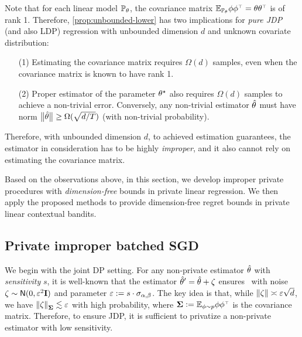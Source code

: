 Note that for each linear model $\mathbb{P}_\theta$, the covariance matrix $\mathbb{E}_{\mathbb{P}_\theta}\phi\phi^{{\scriptscriptstyle\top}}=\theta\theta^{{\scriptscriptstyle\top}}$ is of rank 1. %
Therefore, \cref{prop:unbounded-lower} has two implications for \emph{pure JDP} (and also LDP) regression with unbounded dimension $d$ and unknown covariate distribution:
\begin{itemize}
\item[(1)] Estimating the covariance matrix requires $\Omega(d)$ samples, even when the covariance matrix is known to have rank 1.
\item[(2)] Proper estimator of the parameter $\theta^\star$ also requires $\Omega(d)$ samples to achieve a non-trivial error.
Conversely, any non-trivial estimator $\hat{\theta}$ must have norm $\big\|\hat{\theta}\big\|\geq \Omega(\sqrt{d/T})$ (with non-trivial probability).
\end{itemize}
Therefore, with unbounded dimension $d$, to achieved estimation guarantees, the estimator in consideration has to be highly \emph{improper}, and it also cannot rely on estimating the covariance matrix.


Based on the observations above,
in this section, we develop improper private procedures with \emph{dimension-free} bounds in private linear regression.
We then apply the proposed methods to provide dimension-free regret bounds in private linear contextual bandits.




\subsection{Private improper batched SGD}\label{ssec:l1-dim-free}


We begin with the joint DP setting. For any non-private estimator $\hat{\theta}$ with \emph{sensitivity} $s$, it is well-known that the estimator $\hat{\theta}'=\hat{\theta}+\zeta$ ensures \aJDP~with noise $\zeta\sim \mathsf{N}(0,\varepsilon^2\mathbf{I})$ and parameter $\varepsilon:=s\cdot \sigma_{\alpha,\beta}$. The key idea is that, while $\left\|\zeta\right\|\asymp \varepsilon\sqrt{d}$, we have $\left\|\zeta\right\|_{\boldsymbol{\Sigma}}\lesssim \varepsilon$ with high probability, where $\boldsymbol{\Sigma}\mathrel{\mathop:}= \mathbb{E}_{\phi\sim p}\phi\phi^{{\scriptscriptstyle\top}}$ is the covariance matrix.
Therefore, to ensure JDP, it is sufficient to privatize a non-private estimator with low sensitivity. 

